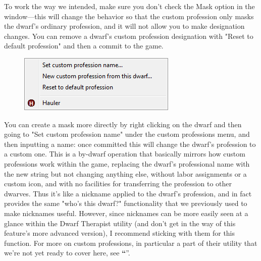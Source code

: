 \documentclass[]{article}
\newcommand{\jump}[1] {\textbf{``\nameref{sec:#1}}''}
\begin{document}
To work the way we intended, make sure you don't check the Mask option in the window---this will change
the behavior so that the custom profession only masks the dwarf's ordinary profession, and it will not
allow you to make designation changes. You can remove a dwarf's custom profession designation with "Reset
to default profession" and then a commit to the game.

\begin{figure}
\vspace{-10pt}
  \begin{center}
    \includegraphics[width=\linewidth]{Sec3Fig11}
  \end{center}
\vspace{-10pt}
\end{figure}
You can create a mask more directly by right clicking on the dwarf and then going to "Set custom
profession name" under the custom professions menu, and then inputting a name: once committed this will
change the dwarf's profession to a custom one. This is a by-dwarf operation that basically mirrors how
custom professions work within the game, replacing the dwarf's professional name with the new string but
not changing anything else, without labor assignments or a custom icon, and with no facilities for
transferring the profession to other dwarves. Thus it's like a nickname applied to the dwarf's
profession, and in fact provides the same "who's this dwarf?" functionality that we previously used to
make nicknames useful. However, since nicknames can be more easily seen at a glance within the Dwarf
Therapist utility (and don't get in the way of this feature's more advanced version), I recommend
sticking with them for this function. For more on custom professions, in particular a part of
their utility that we're not yet ready to cover here, see \jump{Super Labors}.
\end{document}
